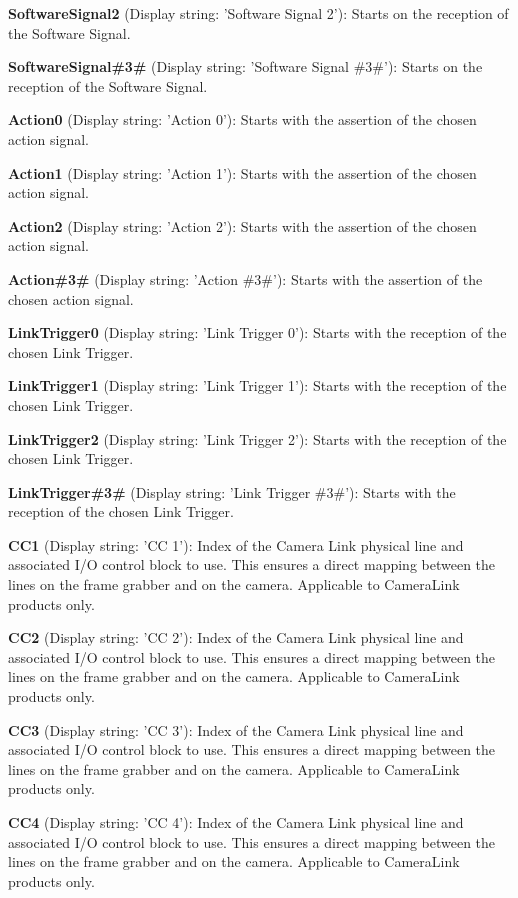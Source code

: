 \begin{DoxyItemize}
\item {\bfseries Software\+Signal2} (Display string\+: 'Software Signal 2')\+: Starts on the reception of the Software Signal.
\item {\bfseries Software\+Signal\#3\#} (Display string\+: 'Software Signal \#3\#')\+: Starts on the reception of the Software Signal.
\item {\bfseries Action0} (Display string\+: 'Action 0')\+: Starts with the assertion of the chosen action signal.
\item {\bfseries Action1} (Display string\+: 'Action 1')\+: Starts with the assertion of the chosen action signal.
\item {\bfseries Action2} (Display string\+: 'Action 2')\+: Starts with the assertion of the chosen action signal.
\item {\bfseries Action\#3\#} (Display string\+: 'Action \#3\#')\+: Starts with the assertion of the chosen action signal.
\item {\bfseries Link\+Trigger0} (Display string\+: 'Link Trigger 0')\+: Starts with the reception of the chosen Link Trigger.
\item {\bfseries Link\+Trigger1} (Display string\+: 'Link Trigger 1')\+: Starts with the reception of the chosen Link Trigger.
\item {\bfseries Link\+Trigger2} (Display string\+: 'Link Trigger 2')\+: Starts with the reception of the chosen Link Trigger.
\item {\bfseries Link\+Trigger\#3\#} (Display string\+: 'Link Trigger \#3\#')\+: Starts with the reception of the chosen Link Trigger.
\item {\bfseries C\+C1} (Display string\+: 'C\+C 1')\+: Index of the Camera Link physical line and associated I/\+O control block to use. This ensures a direct mapping between the lines on the frame grabber and on the camera. Applicable to Camera\+Link products only.
\item {\bfseries C\+C2} (Display string\+: 'C\+C 2')\+: Index of the Camera Link physical line and associated I/\+O control block to use. This ensures a direct mapping between the lines on the frame grabber and on the camera. Applicable to Camera\+Link products only.
\item {\bfseries C\+C3} (Display string\+: 'C\+C 3')\+: Index of the Camera Link physical line and associated I/\+O control block to use. This ensures a direct mapping between the lines on the frame grabber and on the camera. Applicable to Camera\+Link products only.
\item {\bfseries C\+C4} (Display string\+: 'C\+C 4')\+: Index of the Camera Link physical line and associated I/\+O control block to use. This ensures a direct mapping between the lines on the frame grabber and on the camera. Applicable to Camera\+Link products only.
\end{DoxyItemize}

